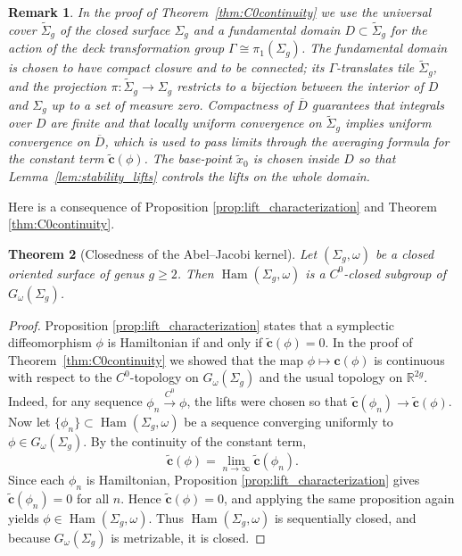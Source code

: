 \documentclass[11pt]{article}
\newtheorem{theorem}{Theorem}[section]
\newtheorem{remark}[theorem]{Remark}
\theoremstyle{definition}
\newcommand{\Ham}{\operatorname{Ham}}
\begin{document}
	\begin{remark}
		\label{rem:universal_cover_domain}
		In the proof of Theorem~\ref{thm:C0continuity} we use the universal cover
		$\widetilde{\Sigma}_g$ of the closed surface $\Sigma_g$ and a fundamental domain
		$D\subset\widetilde{\Sigma}_g$ for the action of the deck transformation group
		$\Gamma\cong\pi_1(\Sigma_g)$. The fundamental domain is chosen to have compact
		closure and to be connected; its $\Gamma$-translates tile $\widetilde{\Sigma}_g$,
		and the projection $\pi:\widetilde{\Sigma}_g\to\Sigma_g$ restricts to a
		bijection between the interior of $D$ and $\Sigma_g$ up to a set of measure
		zero. Compactness of $\overline{D}$ guarantees that integrals over $D$ are
		finite and that locally uniform convergence on $\widetilde{\Sigma}_g$ implies
		uniform convergence on $\overline{D}$, which is used to pass limits through the
		averaging formula for the constant term $\widetilde{\mathbf c}(\phi)$. The
		base-point $\tilde x_0$ is chosen inside $D$ so that Lemma~\ref{lem:stability_lifts}
		controls the lifts on the whole domain.
	\end{remark}
	
	Here is a consequence of Proposition \ref{prop:lift_characterization} and Theorem
	\ref{thm:C0continuity}. 
	
	\begin{theorem}[Closedness of the Abel--Jacobi kernel]
		\label{thm:closed_AJ_kernel}
		Let $(\Sigma_g,\omega)$ be a closed oriented surface of genus $g\ge2$. Then
		$\Ham(\Sigma_g,\omega)$ is a $C^0$-closed subgroup of $G_\omega(\Sigma_g)$.
	\end{theorem}
	
	\begin{proof}
		Proposition \ref{prop:lift_characterization} states that a symplectic
		diffeomorphism $\phi$ is Hamiltonian if and only if $\widetilde{\mathbf c}(\phi)
		= 0$. In the proof of Theorem~\ref{thm:C0continuity} we showed that the map
		$\phi\mapsto \mathbf c(\phi)$ is continuous with respect to the $C^0$-topology
		on $G_\omega(\Sigma_g)$ and the usual topology on $\mathbb R^{2g}$. Indeed, for
		any sequence $\phi_n\xrightarrow{C^0}\phi$, the lifts were chosen so that
		$\widetilde{\mathbf c}(\phi_n) \to\widetilde{\mathbf c}(\phi)$.	Now let $\{\phi_n\}\subset\Ham(\Sigma_g,\omega)$ be a sequence converging
		uniformly to $\phi\in G_\omega(\Sigma_g)$. By the continuity of the constant
		term,
		\[
		\widetilde{\mathbf c}(\phi) = \lim_{n\to\infty}\widetilde{\mathbf c}(\phi_n).
		\]
		Since each $\phi_n$ is Hamiltonian, Proposition \ref{prop:lift_characterization}
		gives $\widetilde{\mathbf c}(\phi_n)=0$ for all $n$. Hence $\widetilde{\mathbf
			c}(\phi)=0$, and applying the same proposition again yields
		$\phi\in\Ham(\Sigma_g,\omega)$. Thus $\Ham(\Sigma_g,\omega)$ is sequentially
		closed, and because $G_\omega(\Sigma_g)$ is metrizable, it is closed.
	\end{proof}
	
\end{document}
